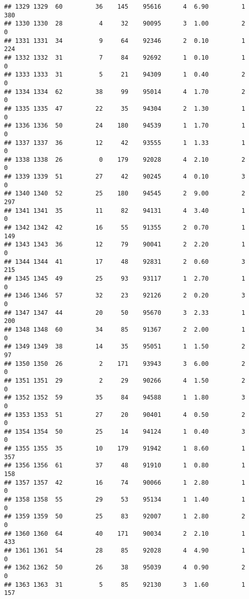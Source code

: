 \documentclass[
]{article}
\begin{document}
\begin{verbatim}
## 1329 1329  60         36    145    95616      4  6.90         1      380
## 1330 1330  28          4     32    90095      3  1.00         2        0
## 1331 1331  34          9     64    92346      2  0.10         1      224
## 1332 1332  31          7     84    92692      1  0.10         1        0
## 1333 1333  31          5     21    94309      1  0.40         2        0
## 1334 1334  62         38     99    95014      4  1.70         2        0
## 1335 1335  47         22     35    94304      2  1.30         1        0
## 1336 1336  50         24    180    94539      1  1.70         1        0
## 1337 1337  36         12     42    93555      1  1.33         1        0
## 1338 1338  26          0    179    92028      4  2.10         2        0
## 1339 1339  51         27     42    90245      4  0.10         3        0
## 1340 1340  52         25    180    94545      2  9.00         2      297
## 1341 1341  35         11     82    94131      4  3.40         1        0
## 1342 1342  42         16     55    91355      2  0.70         1      149
## 1343 1343  36         12     79    90041      2  2.20         1        0
## 1344 1344  41         17     48    92831      2  0.60         3      215
## 1345 1345  49         25     93    93117      1  2.70         1        0
## 1346 1346  57         32     23    92126      2  0.20         3        0
## 1347 1347  44         20     50    95670      3  2.33         1      200
## 1348 1348  60         34     85    91367      2  2.00         1        0
## 1349 1349  38         14     35    95051      1  1.50         2       97
## 1350 1350  26          2    171    93943      3  6.00         2        0
## 1351 1351  29          2     29    90266      4  1.50         2        0
## 1352 1352  59         35     84    94588      1  1.80         3        0
## 1353 1353  51         27     20    90401      4  0.50         2        0
## 1354 1354  50         25     14    94124      1  0.40         3        0
## 1355 1355  35         10    179    91942      1  8.60         1      357
## 1356 1356  61         37     48    91910      1  0.80         1      158
## 1357 1357  42         16     74    90066      1  2.80         1        0
## 1358 1358  55         29     53    95134      1  1.40         1        0
## 1359 1359  50         25     83    92007      1  2.80         2        0
## 1360 1360  64         40    171    90034      2  2.10         1      433
## 1361 1361  54         28     85    92028      4  4.90         1        0
## 1362 1362  50         26     38    95039      4  0.90         2        0
## 1363 1363  31          5     85    92130      3  1.60         1      157

\end{verbatim}
\end{document}
